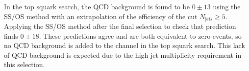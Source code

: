 In the top squark search, the QCD background is found to be $0 \pm 13$ using the SS/OS method with an extrapolation of the efficiency of the cut $N_{\text{jets}}\geq5$. Applying the SS/OS method after the final selection to check that prediction finds $0 \pm 18$. These predictions agree and are both equivalent to zero events, so no QCD background is added to the \etau channel in the top squark search. This lack of QCD background is expected due to the high jet multiplicity requirement in this selection.